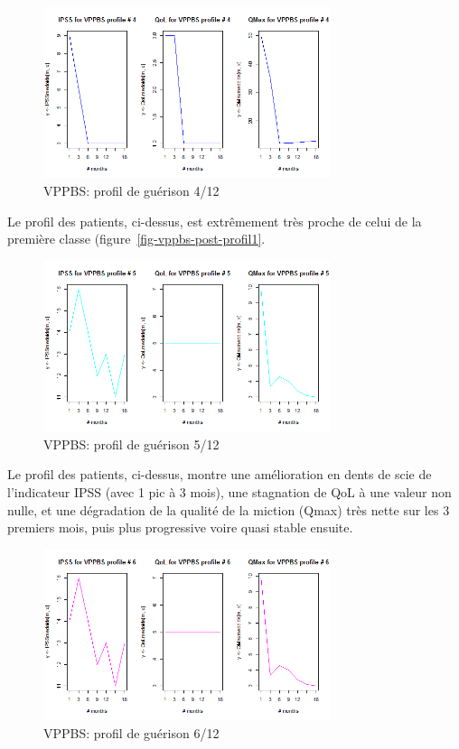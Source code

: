 \begin{figure}[H]
\centering
\includegraphics[width=0.75\textwidth]{../Fig/VPPBS/vppbs-profil-post-04.png}
\caption{VPPBS: profil de guérison 4/12}
\label{fig-vppbs-post-profil4}
\end{figure}

Le profil des patients, ci-dessus, est extrêmement très proche de celui de la première classe (figure~\ref{fig-vppbs-post-profil1}.

\begin{figure}[H]
\centering
\includegraphics[width=0.75\textwidth]{../Fig/VPPBS/vppbs-profil-post-05.png}
\caption{VPPBS: profil de guérison 5/12}
\label{fig-vppbs-post-profil5}
\end{figure}

Le profil des patients, ci-dessus, montre une amélioration en dents de scie de l'indicateur IPSS (avec 1 pic à 3  mois), une stagnation de QoL à une valeur non nulle, et une dégradation de la qualité de la miction (Qmax) très nette sur les 3 premiers mois, puis plus progressive voire quasi stable ensuite.

\begin{figure}[H]
\centering
\includegraphics[width=0.75\textwidth]{../Fig/VPPBS/vppbs-profil-post-06.png}
\caption{VPPBS: profil de guérison 6/12}
\label{fig-vppbs-post-profil6}
\end{figure}

